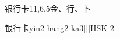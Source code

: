 \begin{entry}{银行卡}{11,6,5}{⾦、⾏、⼘}
  \begin{phonetics}{银行卡}{yin2 hang2 ka3}[][HSK 2]
  \end{phonetics}
\end{entry}
